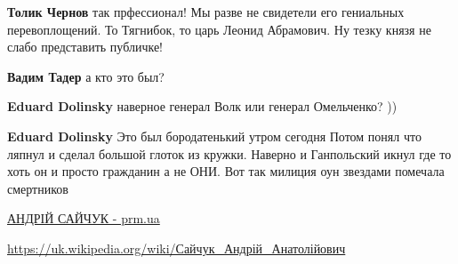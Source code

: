 \begin{itemize}
\begin{itemize}
 
\textbf{Толик Чернов} так прфессионал! Мы разве не свидетели его гениальных перевоплощений. То Тягнибок, то царь Леонид Абрамович. Ну тезку князя не слабо представить публичке!


 
\textbf{Вадим Тадер} а кто это был?

 
\textbf{Eduard Dolinsky} наверное генерал Волк или генерал Омельченко? ))

 
\textbf{Eduard Dolinsky} Это был бородатенький утром сегодня Потом понял что
ляпнул и сделал большой глоток из кружки. Наверно и Ганпольский икнул где то
хоть он и просто гражданин а не ОНИ. Вот так милиция оун звездами помечала
смертников

 
\href{https://prm.ua/leadings/andriy-saychuk/}{%
АНДРІЙ САЙЧУК - prm.ua%
}

 
\url{https://uk.wikipedia.org/wiki/Сайчук_Андрій_Анатолійович}

\end{itemize}

\end{itemize}

